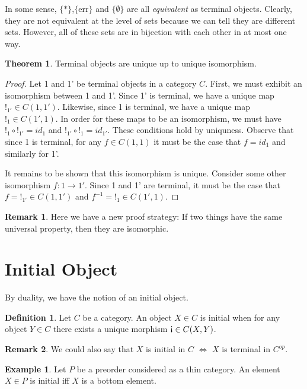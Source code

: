 \documentclass[12pt]{article}
\theoremstyle{definition}
\newtheorem{theorem}{Theorem}[section]
\newtheorem{remark}{Remark}[section]
\newtheorem{example}{Example}[section]
\newtheorem{definition}{Definition}[section]
\newcommand{\initial}{\mathord{\text{\rotatebox[origin=c]{180}{!}}}}
\begin{document}
In some sense, $\{*\}$,$\{\textrm{err}\}$ and $\{\emptyset\}$ are all \textit{equivalent} as terminal objects. Clearly, they are not equivalent at the level of sets because we can tell they are different sets. However, all of these sets are in bijection with each other in at most one way.

\begin{theorem}
    Terminal objects are unique up to unique isomorphism.
\end{theorem}
\begin{proof}
    Let 1 and 1' be terminal objects in a category $C$. First, we must exhibit an isomorphism between 1 and 1'. Since 1' is terminal, we have a unique map $!_{1'} \in C(1,1')$. Likewise, since 1 is terminal, we have a unique map $!_1 \in C(1',1)$. In order for these maps to be an isomorphism, we must have $!_1 \circ !_{1'} = id_1$ and $!_{1'} \circ !_{1} = id_{1'}$. These conditions hold by uniquness. Observe that since 1 is terminal, for any $f \in C(1,1)$ it must be the case that $f = id_1$ and similarly for 1'.

    It remains to be shown that this isomorphism is unique. Consider some other isomorphism $f : 1 \to 1'$. Since 1 and 1' are terminal, it must be the case that $f = !_{1'} \in C(1,1')$ and $f^{-1} = !_1 \in C(1',1)$.
    
\end{proof}

\begin{remark}
    Here we have a new proof strategy: If two things have the same universal property, then they are isomorphic.
\end{remark}
\section{Initial Object}
By duality, we have the notion of an initial object.
\begin{definition}
    Let $C$ be a category. An object $X \in C$ is initial when for any object $Y\in C$ there exists a unique morphism $\initial \in C(X,Y)$.
    \end{definition}

\begin{remark}
    We could also say that $X$ is initial in $C$ $\iff$ $X$ is terminal in $C^{op}$.
\end{remark}

\begin{example}
    Let $P$ be a preorder considered as a thin category. An element $X \in P$ is initial iff $X$ is a bottom element.
\end{example}
\end{document}
